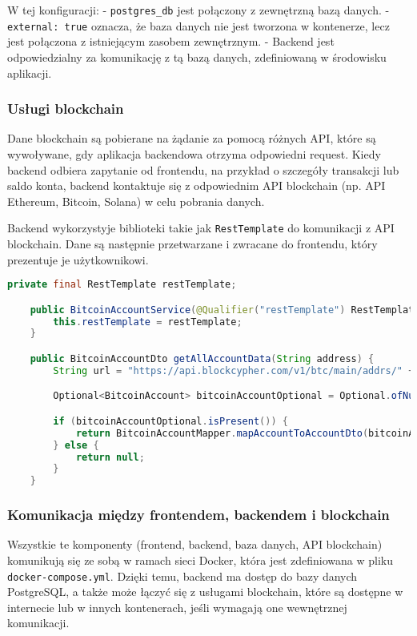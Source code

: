 W tej konfiguracji:
- \texttt{postgres\_db} jest połączony z zewnętrzną bazą danych.
- \texttt{external: true} oznacza, że baza danych nie jest tworzona w kontenerze, lecz jest połączona z istniejącym zasobem zewnętrznym.
- Backend jest odpowiedzialny za komunikację z tą bazą danych, zdefiniowaną w środowisku aplikacji.

\subsubsection{Usługi blockchain}

Dane blockchain są pobierane na żądanie za pomocą różnych API, które są wywoływane, gdy aplikacja backendowa otrzyma odpowiedni request. Kiedy backend odbiera zapytanie od frontendu, na przykład o szczegóły transakcji lub saldo konta, backend kontaktuje się z odpowiednim API blockchain (np. API Ethereum, Bitcoin, Solana) w celu pobrania danych.

Backend wykorzystyje biblioteki takie jak \texttt{RestTemplate} do komunikacji z API blockchain. Dane są następnie przetwarzane i zwracane do frontendu, który prezentuje je użytkownikowi.

\begin{lstlisting}[language=Java,style=JavaStyle]
private final RestTemplate restTemplate;

    public BitcoinAccountService(@Qualifier("restTemplate") RestTemplate restTemplate) {
        this.restTemplate = restTemplate;
    }

    public BitcoinAccountDto getAllAccountData(String address) {
        String url = "https://api.blockcypher.com/v1/btc/main/addrs/" + address + "/full";

        Optional<BitcoinAccount> bitcoinAccountOptional = Optional.ofNullable(restTemplate.getForObject(url, BitcoinAccount.class));

        if (bitcoinAccountOptional.isPresent()) {
            return BitcoinAccountMapper.mapAccountToAccountDto(bitcoinAccountOptional.get());
        } else {
            return null;
        }
    }
\end{lstlisting}

\subsubsection{Komunikacja między frontendem, backendem i blockchain}

Wszystkie te komponenty (frontend, backend, baza danych, API blockchain) komunikują się ze sobą w ramach sieci Docker, która jest zdefiniowana w pliku \texttt{docker-compose.yml}. Dzięki temu, backend ma dostęp do bazy danych PostgreSQL, a także może łączyć się z usługami blockchain, które są dostępne w internecie lub w innych kontenerach, jeśli wymagają one wewnętrznej komunikacji.